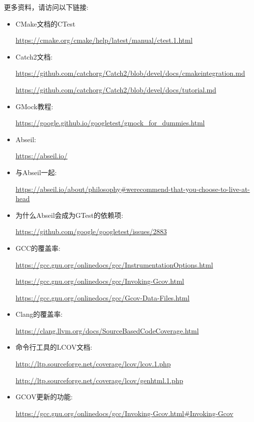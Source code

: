 更多资料，请访问以下链接:

\begin{itemize}
\item 
CMake文档的CTest

\url{https://cmake.org/cmake/help/latest/manual/ctest.1.html}

\item 
Catch2文档:

\url{https://github.com/catchorg/Catch2/blob/devel/docs/cmakeintegration.md}

\url{https://github.com/catchorg/Catch2/blob/devel/docs/tutorial.md}

\item 
GMock教程: 

\url{https://google.github.io/googletest/gmock\_for\_dummies.html}

\item 
Abseil: 

\url{https://abseil.io/}

\item 
与Abseil一起:

\url{https://abseil.io/about/philosophy\#werecommend-that-you-choose-to-live-at-head}

\item 
为什么Abseil会成为GTest的依赖项:

\url{https://github.com/google/googletest/issues/2883}

\item 
GCC的覆盖率:

\url{https://gcc.gnu.org/onlinedocs/gcc/InstrumentationOptions.html}

\url{https://gcc.gnu.org/onlinedocs/gcc/Invoking-Gcov.html}

\url{https://gcc.gnu.org/onlinedocs/gcc/Gcov-Data-Files.html}

\item 
Clang的覆盖率:

\url{https://clang.llvm.org/docs/SourceBasedCodeCoverage.html}

\item 
命令行工具的LCOV文档:

\url{http://ltp.sourceforge.net/coverage/lcov/lcov.1.php}

\url{http://ltp.sourceforge.net/coverage/lcov/genhtml.1.php}

\item 
GCOV更新的功能:

\url{ https://gcc.gnu.org/onlinedocs/gcc/Invoking-Gcov.html\#Invoking-Gcov}
\end{itemize}
